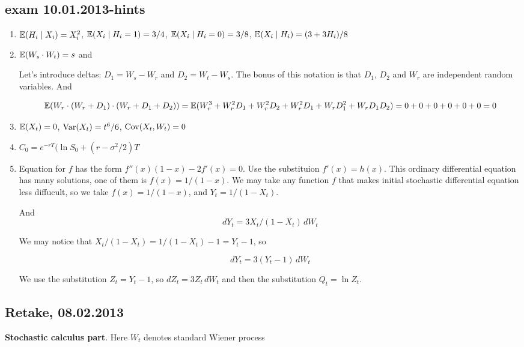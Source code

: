 \documentclass[12pt, a4paper]{article}
\begin{document}
\subsection{exam 10.01.2013-hints}
\begin{enumerate}
\item $\mathbb{E}(H_i \mid X_i)=X_i^2$, $\mathbb{E}(X_i \mid H_i=1)=3/4$, $\mathbb{E}(X_i \mid H_i=0)=3/8$, $\mathbb{E}(X_i \mid H_i)= (3+3H_i)/8$
\item $\mathbb{E}(W_s \cdot W_t)=s$ and

Let's introduce deltas: $D_1 = W_s - W_r$ and $D_2 = W_t - W_s$. The bonus of this notation is that $D_1$, $D_2$ and $W_r$ are independent random variables. And

\[
\mathbb{E}(W_r \cdot (W_r + D_1) \cdot (W_r + D_1 + D_2))=\mathbb{E}(W_r^3 + W_r^2 D_1 + W_r^2 D_2 + W_r^2 D_1 + W_r D_1^2 + W_r D_1 D_2) = 0 + 0 + 0 + 0 + 0 + 0 = 0
\]



\item $\mathbb{E}(X_t)=0$, $\operatorname{Var}(X_t)=t^6/6$, $\operatorname{Cov}(X_t,W_t)=0$
\item $C_0=e^{-rT}(\ln S_0+(r-\sigma^2/2)T$
\item Equation for $f$ has the form $f''(x)(1-x)-2f'(x)=0$. Use the substituion $f'(x)=h(x)$. This ordinary differential equation has many solutions, one of them is $f(x)=1/(1-x)$.   We may take any function $f$ that makes initial stochastic differential equation less diffucult, so we take $f(x)=1/(1-x)$, and  $Y_t=1/(1-X_t)$.

And
\[
dY_t = 3X_t / (1-X_t) \, dW_t
\]

We may notice that $X_t/(1-X_t)=1/(1-X_t)-1=Y_t-1$, so

\[
dY_t= 3(Y_t-1) \, dW_t
\]

We use the substitution $Z_t=Y_t-1$, so $dZ_t=3Z_t \, dW_t$ and then the substitution $Q_t = \ln Z_t$.


\end{enumerate}




\subsection{Retake, 08.02.2013}

\textbf{Stochastic calculus part}. Here $W_t$ denotes standard Wiener process

\vspace{20pt}
\end{document}
